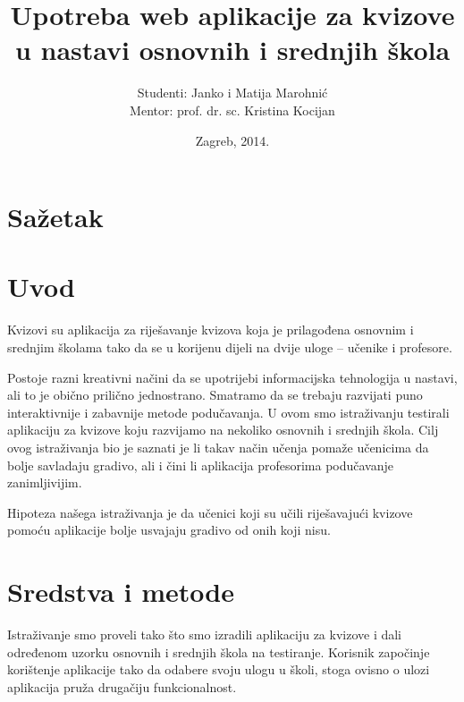 \documentclass{scrreprt}
\begin{document}
\titlehead{Sveučilište u Zagrebu\\Filozofski fakultet\\Odsijek za informacijske
i komunikacijske znanosti\\Akademska godina 2013/14.}
\title{Upotreba web aplikacije za kvizove u nastavi osnovnih i srednjih škola}
\author{Studenti: Janko i Matija Marohnić\\Mentor: prof. dr. sc. Kristina
Kocijan}
\date{Zagreb, 2014.}

\maketitle
\tableofcontents

\chapter{Sažetak}

\chapter{Uvod}

Kvizovi su aplikacija za riješavanje kvizova koja je prilagođena osnovnim i
srednjim školama tako da se u korijenu dijeli na dvije uloge -- učenike i
profesore.

Postoje razni kreativni načini da se upotrijebi informacijska tehnologija u
nastavi, ali to je obično prilično jednostrano. Smatramo da se trebaju razvijati
puno interaktivnije i zabavnije metode podučavanja. U ovom smo istraživanju
testirali aplikaciju za kvizove koju razvijamo na nekoliko osnovnih i srednjih
škola. Cilj ovog istraživanja bio je saznati je li takav način učenja pomaže
učenicima da bolje savladaju gradivo, ali i čini li aplikacija profesorima
podučavanje zanimljivijim.

Hipoteza našega istraživanja je da učenici koji su učili riješavajući kvizove
pomoću aplikacije bolje usvajaju gradivo od onih koji nisu.

\chapter{Sredstva i metode}

Istraživanje smo proveli tako što smo izradili aplikaciju za kvizove i dali
određenom uzorku osnovnih i srednjih škola na testiranje. Korisnik započinje
korištenje aplikacije tako da odabere svoju ulogu u školi, stoga ovisno o ulozi
aplikacija pruža drugačiju funkcionalnost.
\end{document}
